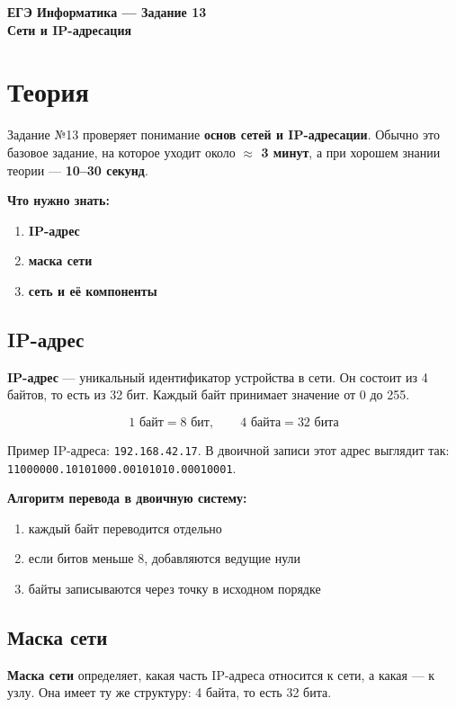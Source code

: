 \documentclass[11pt]{article}
\begin{document}
\begin{center}
{\LARGE \textbf{ЕГЭ Информатика --- Задание 13}}\\[-2pt]
{\large \textbf{Сети и IP-адресация}}
\end{center}

\section*{Теория}

Задание №13 проверяет понимание \textbf{основ сетей и IP-адресации}. Обычно это базовое задание, на которое уходит около \textbf{$\approx$ 3 минут}, а при хорошем знании теории --- \textbf{10--30 секунд}.

\textbf{Что нужно знать:}
\begin{enumerate}
  \item \textbf{IP-адрес}
  \item \textbf{маска сети}
  \item \textbf{сеть и её компоненты}
\end{enumerate}

\subsection*{IP-адрес}

\textbf{IP-адрес} --- уникальный идентификатор устройства в сети. Он состоит из 4 байтов, то есть из 32 бит. Каждый байт принимает значение от 0 до 255.

\[
1 \text{ байт} = 8 \text{ бит}, \qquad 4 \text{ байта} = 32 \text{ бита}
\]

Пример IP-адреса: \texttt{192.168.42.17}. В двоичной записи этот адрес выглядит так: \texttt{11000000.10101000.00101010.00010001}.

\textbf{Алгоритм перевода в двоичную систему:}
\begin{enumerate}
  \item каждый байт переводится отдельно
  \item если битов меньше 8, добавляются ведущие нули
  \item байты записываются через точку в исходном порядке
\end{enumerate}

\subsection*{Маска сети}

\textbf{Маска сети} определяет, какая часть IP-адреса относится к сети, а какая --- к узлу. Она имеет ту же структуру: 4 байта, то есть 32 бита.
\end{document}
